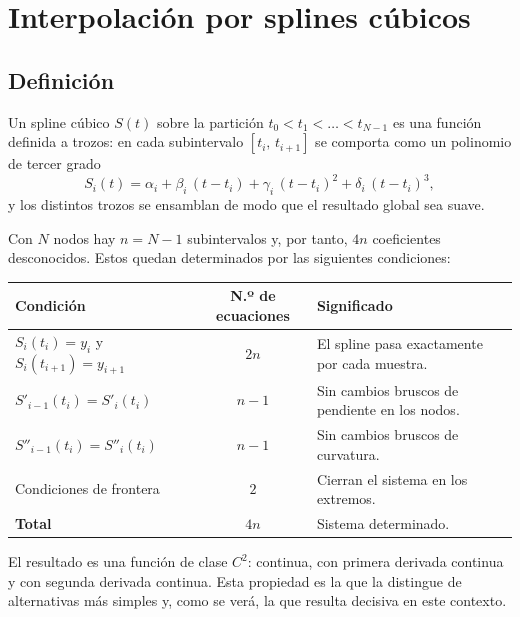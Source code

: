 \documentclass[12pt,a4paper]{article}
\begin{document}
\section{Interpolación por splines cúbicos}

\subsection{Definición}

Un spline cúbico $S(t)$ sobre la partición $t_0 < t_1 < \dots < t_{N-1}$ es una función definida a trozos: en cada subintervalo $[t_i,\, t_{i+1}]$ se comporta como un polinomio de tercer grado
\begin{equation}
S_i(t) = \alpha_i + \beta_i\,(t - t_i) + \gamma_i\,(t - t_i)^2 + \delta_i\,(t - t_i)^3,
\label{eq:trozo}
\end{equation}
y los distintos trozos se ensamblan de modo que el resultado global sea suave.

Con $N$ nodos hay $n = N-1$ subintervalos y, por tanto, $4n$ coeficientes desconocidos. Estos quedan determinados por las siguientes condiciones:

\begin{center}
\begin{tabularx}{0.95\textwidth}{@{}l c X@{}}
\toprule
\textbf{Condición} & \textbf{N.º de ecuaciones} & \textbf{Significado} \\
\midrule
$S_i(t_i) = y_i$ y $S_i(t_{i+1}) = y_{i+1}$ & $2n$ & El spline pasa exactamente por cada muestra. \\
$S'_{i-1}(t_i) = S'_i(t_i)$ & $n-1$ & Sin cambios bruscos de pendiente en los nodos. \\
$S''_{i-1}(t_i) = S''_i(t_i)$ & $n-1$ & Sin cambios bruscos de curvatura. \\
Condiciones de frontera & $2$ & Cierran el sistema en los extremos. \\
\midrule
\textbf{Total} & $4n$ & Sistema determinado. \\
\bottomrule
\end{tabularx}
\end{center}

El resultado es una función de clase $C^2$: continua, con primera derivada continua y con segunda derivada continua. Esta propiedad es la que la distingue de alternativas más simples y, como se verá, la que resulta decisiva en este contexto.
\end{document}
